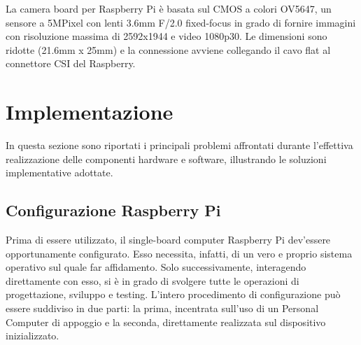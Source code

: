 \documentclass[12pt]{article}
\begin{document}
La camera board per Raspberry Pi è basata sul CMOS a colori OV5647, un sensore a 5MPixel con lenti 3.6mm F/2.0 fixed-focus in grado di fornire immagini con risoluzione massima di 2592x1944 e video 1080p30. Le dimensioni sono ridotte (21.6mm x 25mm) e la connessione avviene collegando il cavo flat al connettore CSI del Raspberry.

\newpage



\section{Implementazione}\label{sec:implementazione}

In questa sezione sono riportati i principali problemi affrontati durante l'effettiva realizzazione delle componenti hardware e software, illustrando le soluzioni implementative adottate.

\subsection{Configurazione Raspberry Pi}
Prima di essere utilizzato, il single-board computer Raspberry Pi dev'essere opportunamente configurato. Esso necessita, infatti, di un vero e proprio sistema operativo sul quale far affidamento. Solo successivamente, interagendo direttamente con esso, si è in grado di svolgere tutte le operazioni di progettazione, sviluppo e testing. L'intero procedimento di configurazione può essere suddiviso in due parti: la prima, incentrata sull'uso di un Personal Computer di appoggio e la seconda, direttamente realizzata sul dispositivo inizializzato.
\end{document}
